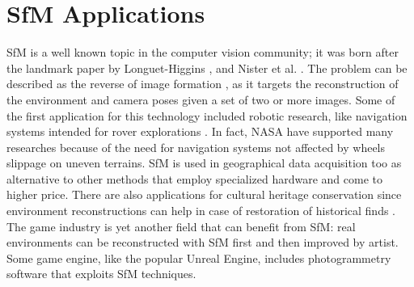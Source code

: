 \section{SfM Applications}
SfM is a well known topic in the computer vision community; it was born after 
the landmark paper by Longuet-Higgins \cite{longuet1981computer}, and
Nister et al. \cite{moravec1980obstacle}.
The problem can be described as the reverse of image formation
\cite{Wei2013}, as it targets the reconstruction of the environment 
and camera poses given a set of two or more images.
Some of the first application for this technology included robotic research, 
like navigation systems intended for rover explorations 
\cite{moravec1980obstacle,durrant1996localization}. In fact, NASA have supported
many researches because of the need for navigation systems not affected by wheels
slippage on uneven terrains.
SfM is used in geographical data acquisition too
\cite{fonstad2013topographic,westoby2012structure,james2012straightforward}
as alternative to other methods that employ specialized hardware and 
come to higher price.
There are also applications for cultural heritage conservation since 
environment reconstructions can help in case of restoration of historical finds
\cite{kraus2007photogrammetry}.
The game industry is yet another field that can benefit from 
SfM: real environments can be reconstructed with SfM first and then 
improved by artist. Some game engine, like the popular Unreal Engine\registered,
includes photogrammetry software that exploits SfM techniques. 
